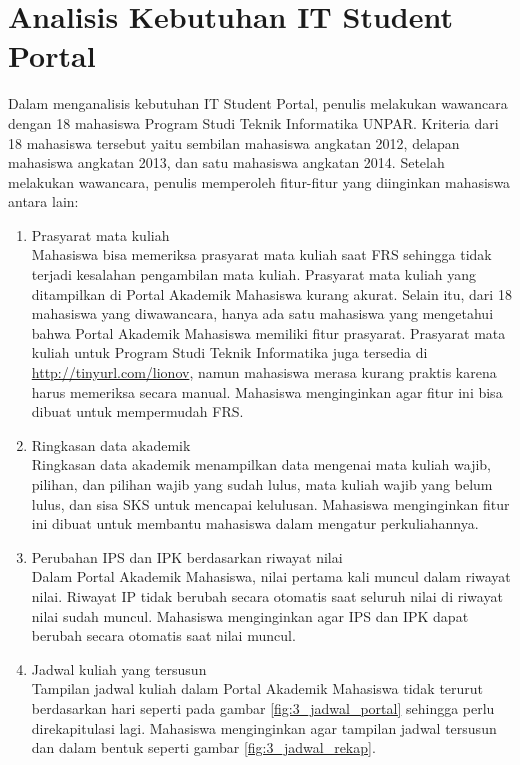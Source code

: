 \section{Analisis Kebutuhan IT Student Portal}
\label{sec:kebutuhan}
Dalam menganalisis kebutuhan IT Student Portal, penulis melakukan wawancara dengan 18 mahasiswa Program Studi Teknik Informatika UNPAR. Kriteria dari 18 mahasiswa tersebut yaitu sembilan mahasiswa angkatan 2012, delapan mahasiswa angkatan 2013, dan satu mahasiswa angkatan 2014. Setelah melakukan wawancara, penulis memperoleh fitur-fitur yang diinginkan mahasiswa antara lain:
\begin{enumerate}
	\item Prasyarat mata kuliah\\
	Mahasiswa bisa memeriksa prasyarat mata kuliah saat FRS sehingga tidak terjadi kesalahan pengambilan mata kuliah. Prasyarat mata kuliah yang ditampilkan di Portal Akademik Mahasiswa kurang akurat. Selain itu, dari 18 mahasiswa yang diwawancara, hanya ada satu mahasiswa yang mengetahui bahwa Portal Akademik Mahasiswa memiliki fitur prasyarat. Prasyarat mata kuliah untuk Program Studi Teknik Informatika juga tersedia di \url{http://tinyurl.com/lionov}, namun mahasiswa merasa kurang praktis karena harus memeriksa secara manual. Mahasiswa menginginkan agar fitur ini bisa dibuat untuk mempermudah FRS.
	\item Ringkasan data akademik\\
	Ringkasan data akademik menampilkan data mengenai mata kuliah wajib, pilihan, dan pilihan wajib yang sudah lulus, mata kuliah wajib yang belum lulus, dan sisa SKS untuk mencapai kelulusan. Mahasiswa menginginkan fitur ini dibuat untuk membantu mahasiswa dalam mengatur perkuliahannya.
	\item Perubahan IPS dan IPK berdasarkan riwayat nilai\\
	Dalam Portal Akademik Mahasiswa, nilai pertama kali muncul dalam riwayat nilai. Riwayat IP tidak berubah secara otomatis saat seluruh nilai di riwayat nilai sudah muncul. Mahasiswa menginginkan agar IPS dan IPK dapat berubah secara otomatis saat nilai muncul.
	\item Jadwal kuliah yang tersusun\\
	Tampilan jadwal kuliah dalam Portal Akademik Mahasiswa tidak terurut berdasarkan hari seperti pada gambar \ref{fig:3_jadwal_portal} sehingga perlu direkapitulasi lagi. Mahasiswa menginginkan agar tampilan jadwal tersusun dan dalam bentuk seperti gambar \ref{fig:3_jadwal_rekap}.
		\begin{figure}[H]

\end{figure}
\end{enumerate}
